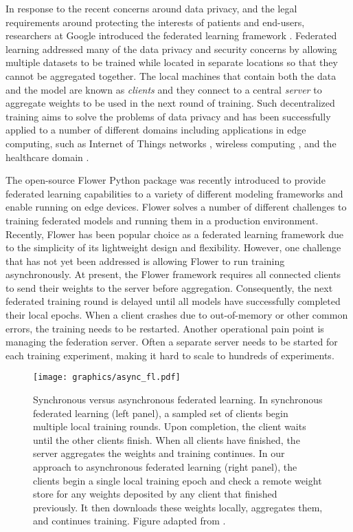 \documentclass[twocolumn, switch]{article} %
\begin{document}
In response to the recent concerns around data privacy, and the legal requirements around protecting the interests of patients and end-users, researchers at Google introduced the federated learning framework \cite{fed_1, fed_2}. Federated learning addressed many of the data privacy and security concerns by allowing multiple datasets to be trained while located in separate locations so that they cannot be aggregated together. The local machines that contain both the data and the model are known as \textit{clients} and they connect to a central \textit{server} to aggregate weights to be used in the next round of training. Such decentralized training aims to solve the problems of data privacy and has been successfully applied to a number of different domains including applications in edge computing, such as Internet of Things networks \cite{fed_iot}, wireless computing \cite{fed_wireless}, and the healthcare domain \cite{fed_healthcare}. 

The open-source Flower Python package \cite{flower} was recently introduced to provide federated learning capabilities to a variety of different modeling frameworks and enable running on edge devices. Flower solves a number of different challenges to training federated models and running them in a production environment. Recently, Flower has been popular choice as a federated learning framework due to the simplicity of its lightweight design and flexibility. However, one challenge that has not yet been addressed is allowing Flower to run training asynchronously. At present, the Flower framework requires all connected clients to send their weights to the server before aggregation. Consequently, the next federated training round is delayed until all models have successfully completed their local epochs. When a client crashes due to out-of-memory or other common errors, the training needs to be restarted. Another operational pain point is managing the federation server. Often a separate server needs to be started for each training experiment, making it hard to scale to hundreds of experiments.

\begin{figure*}
    \centering
    \texttt{[image: graphics/async\_fl.pdf]}
    \caption{Synchronous versus asynchronous federated learning. In synchronous federated learning (left panel), a sampled set of clients begin multiple local training rounds. Upon completion, the client waits until the other clients finish. When all clients have finished, the server aggregates the weights and training continues. In our approach to asynchronous federated learning (right panel), the clients begin a single local training epoch and check a remote weight store for any weights deposited by any client that finished previously. It then downloads these weights locally, aggregates them, and continues training. Figure adapted from \cite{fed_async1}.}
    \label{fig:syncasync}
\end{figure*}
\end{document}
